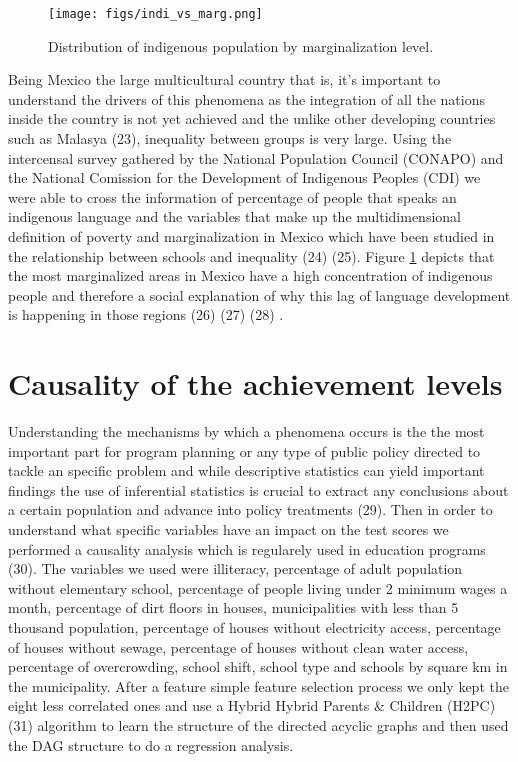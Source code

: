 \documentclass[9pt,twocolumn,twoside,]{pnas-new}
\begin{document}
\begin{figure}[H]
\centering
\texttt{[image: figs/indi\_vs\_marg.png]}
\caption{Distribution of indigenous population by marginalization level.}
\label{fig:indiMarg}
\end{figure}

Being Mexico the large multicultural country that is, it's important to
understand the drivers of this phenomena as the integration of all the
nations inside the country is not yet achieved and the unlike other
developing countries such as Malasya (23), inequality between groups is
very large. Using the intercensal survey gathered by the National
Population Council (CONAPO) and the National Comission for the
Development of Indigenous Peoples (CDI) we were able to cross the
information of percentage of people that speaks an indigenous language
and the variables that make up the multidimensional definition of
poverty and marginalization in Mexico which have been studied in the
relationship between schools and inequality (24) (25). Figure
\ref{fig:indiMarg} depicts that the most marginalized areas in Mexico
have a high concentration of indigenous people and therefore a social
explanation of why this lag of language development is happening in
those regions (26) (27) (28) .

\hypertarget{causality-of-the-achievement-levels}{%
\section*{Causality of the achievement
levels}\label{causality-of-the-achievement-levels}}

Understanding the mechanisms by which a phenomena occurs is the the most
important part for program planning or any type of public policy
directed to tackle an specific problem and while descriptive statistics
can yield important findings the use of inferential statistics is
crucial to extract any conclusions about a certain population and
advance into policy treatments (29). Then in order to understand what
specific variables have an impact on the test scores we performed a
causality analysis which is regularely used in education programs (30).
The variables we used were illiteracy, percentage of adult population
without elementary school, percentage of people living under 2 minimum
wages a month, percentage of dirt floors in houses, municipalities with
less than 5 thousand population, percentage of houses without
electricity access, percentage of houses without sewage, percentage of
houses without clean water access, percentage of overcrowding, school
shift, school type and schools by square km in the municipality. After a
feature simple feature selection process we only kept the eight less
correlated ones and use a Hybrid Hybrid Parents \& Children (H2PC)(31)
algorithm to learn the structure of the directed acyclic graphs and then
used the DAG structure to do a regression analysis.
\end{document}
